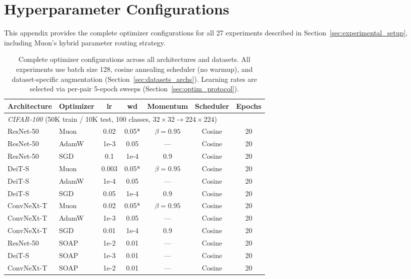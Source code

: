 \section{Hyperparameter Configurations}
\label{sec:hyperparams}\label{app:hyperparams}

This appendix provides the complete optimizer configurations for all 27 experiments described in Section~\ref{sec:experimental_setup}, including Muon's hybrid parameter routing strategy.

\begin{table}[t]
\centering
\caption{Complete optimizer configurations across all architectures and datasets. All experiments use batch size 128, cosine annealing scheduler (no warmup), and dataset-specific augmentation (Section~\ref{sec:datasets_archs}). Learning rates are selected via per-pair 5-epoch sweeps (Section~\ref{sec:optim_protocol}).}
\label{tab:optimizer_config}
\small
\begin{tabular}{@{}llccccc@{}}
\toprule
Architecture & Optimizer & lr & wd & Momentum & Scheduler & Epochs \\
\midrule
\multicolumn{7}{l}{\textit{CIFAR-100} (50K train / 10K test, 100 classes, $32\times32 \to 224\times224$)} \\
\midrule
ResNet-50   & Muon  & 0.02  & 0.05* & $\beta=0.95$ & Cosine & 20 \\
ResNet-50   & AdamW & 1e-3  & 0.05  & ---           & Cosine & 20 \\
ResNet-50   & SGD   & 0.1   & 1e-4  & 0.9           & Cosine & 20 \\
\midrule
DeiT-S      & Muon  & 0.003 & 0.05* & $\beta=0.95$ & Cosine & 20 \\
DeiT-S      & AdamW & 1e-4  & 0.05  & ---           & Cosine & 20 \\
DeiT-S      & SGD   & 0.05  & 1e-4  & 0.9           & Cosine & 20 \\
\midrule
ConvNeXt-T  & Muon  & 0.02  & 0.05* & $\beta=0.95$ & Cosine & 20 \\
ConvNeXt-T  & AdamW & 1e-3  & 0.05  & ---           & Cosine & 20 \\
ConvNeXt-T  & SGD   & 0.01  & 1e-4  & 0.9           & Cosine & 20 \\
\midrule
ResNet-50   & SOAP  & 1e-2  & 0.01  & ---           & Cosine & 20 \\
DeiT-S      & SOAP  & 1e-3  & 0.01  & ---           & Cosine & 20 \\
ConvNeXt-T  & SOAP  & 1e-2  & 0.01  & ---           & Cosine & 20 \\

\end{tabular}
\end{table}
